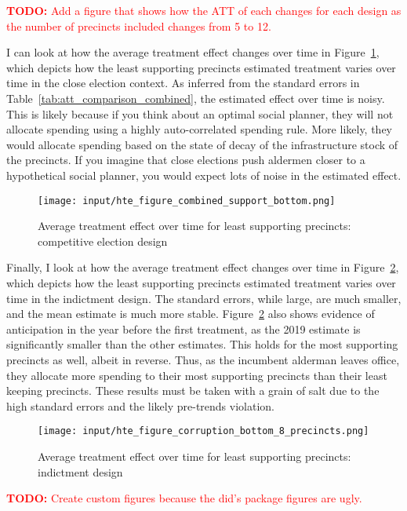 \textcolor{red}{\textbf{TODO:} Add a figure that shows how the ATT of each changes for each design as the number of precincts included changes from 5 to 12.}

I can look at how the average treatment effect changes over time in Figure~\ref{fig:att_comparison_close_election_bottom}, which depicts how the least supporting precincts estimated treatment varies over time in the close election context.
As inferred from the standard errors in Table~\ref{tab:att_comparison_combined}, the estimated effect over time is noisy.
This is likely because if you think about an optimal social planner, they will not allocate spending using a highly auto-correlated spending rule.
More likely, they would allocate spending based on the state of decay of the infrastructure stock of the precincts.
If you imagine that close elections push aldermen closer to a hypothetical social planner, you would expect lots of noise in the estimated effect.

\begin{figure}[ht]
    \centering
    \texttt{[image: input/hte\_figure\_combined\_support\_bottom.png]}
    \caption{Average treatment effect over time for least supporting precincts: competitive election design}
    \label{fig:att_comparison_close_election_bottom}
\end{figure}


Finally, I look at how the average treatment effect changes over time in Figure~\ref{fig:att_comparison_corruption_bottom}, which depicts how the least supporting precincts estimated treatment varies over time in the indictment design.
The standard errors, while large, are much smaller, and the mean estimate is much more stable.
Figure~\ref{fig:att_comparison_corruption_bottom} also shows evidence of anticipation in the year before the first treatment, as the 2019 estimate is significantly smaller than the other estimates.
This holds for the most supporting precincts as well, albeit in reverse.
Thus, as the incumbent alderman leaves office, they allocate more spending to their most supporting precincts than their least keeping precincts.
These results must be taken with a grain of salt due to the high standard errors and the likely pre-trends violation.

\begin{figure}[H]
    \centering
    \texttt{[image: input/hte\_figure\_corruption\_bottom\_8\_precincts.png]}
    \caption{Average treatment effect over time for least supporting precincts: indictment design}
    \label{fig:att_comparison_corruption_bottom}
\end{figure}

\textcolor{red}{\textbf{TODO:} Create custom figures because the did's package figures are ugly.}